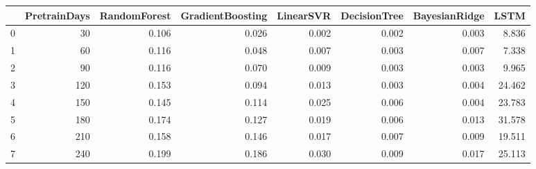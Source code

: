\begin{tabular}{lrrrrrrr}
\toprule
{} &  PretrainDays &  RandomForest &  GradientBoosting &  LinearSVR &  DecisionTree &  BayesianRidge &   LSTM \\
\midrule
0 &            30 &         0.106 &             0.026 &      0.002 &         0.002 &          0.003 &  8.836 \\
1 &            60 &         0.116 &             0.048 &      0.007 &         0.003 &          0.007 &  7.338 \\
2 &            90 &         0.116 &             0.070 &      0.009 &         0.003 &          0.003 &  9.965 \\
3 &           120 &         0.153 &             0.094 &      0.013 &         0.003 &          0.004 & 24.462 \\
4 &           150 &         0.145 &             0.114 &      0.025 &         0.006 &          0.004 & 23.783 \\
5 &           180 &         0.174 &             0.127 &      0.019 &         0.006 &          0.013 & 31.578 \\
6 &           210 &         0.158 &             0.146 &      0.017 &         0.007 &          0.009 & 19.511 \\
7 &           240 &         0.199 &             0.186 &      0.030 &         0.009 &          0.017 & 25.113 \\
\bottomrule
\end{tabular}
